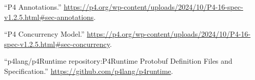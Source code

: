 \documentclass[11pt]{article}
\begin{document}
{{\begin{thebibliography}{45}
\mdbibitemlabel{{}[17]}\textquotedblleft{}P4 Annotations.\textquotedblright{} \href{https://p4.org/wp-content/uploads/2024/10/P4-16-spec-v1.2.5.html\%23sec-annotations}{{\ttfamily https://\hspace{0pt}p4.\hspace{0pt}org/\hspace{0pt}wp-\hspace{0pt}content/\hspace{0pt}uploads/\hspace{0pt}2024/\hspace{0pt}10/\hspace{0pt}P4-\hspace{0pt}16-\hspace{0pt}spec-\hspace{0pt}v1.\hspace{0pt}2.\hspace{0pt}5.\hspace{0pt}html\#\hspace{0pt}sec-\hspace{0pt}annotations}}.\label{p4annotations}%

\mdbibitemlabel{{}[18]}\textquotedblleft{}P4 Concurrency Model.\textquotedblright{} \href{https://p4.org/wp-content/uploads/2024/10/P4-16-spec-v1.2.5.html\%23sec-concurrency}{{\ttfamily https://\hspace{0pt}p4.\hspace{0pt}org/\hspace{0pt}wp-\hspace{0pt}content/\hspace{0pt}uploads/\hspace{0pt}2024/\hspace{0pt}10/\hspace{0pt}P4-\hspace{0pt}16-\hspace{0pt}spec-\hspace{0pt}v1.\hspace{0pt}2.\hspace{0pt}5.\hspace{0pt}html\#\hspace{0pt}sec-\hspace{0pt}concurrency}}.\label{p4concurrency}%

\mdbibitemlabel{{}[19]}\textquotedblleft{}p4lang/p4Runtime repository:P4Runtime Protobuf Definition Files and Specification.\textquotedblright{} \href{https://github.com/p4lang/p4runtime}{{\ttfamily https://\hspace{0pt}github.\hspace{0pt}com/\hspace{0pt}p4lang/\hspace{0pt}p4runtime}}.\label{p4runtimerepo}%


\end{thebibliography}}}
\end{document}
